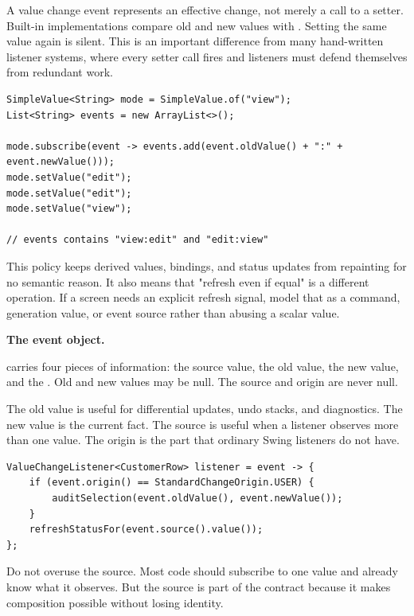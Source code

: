 A value change event represents an effective change, not merely a call to a
setter. Built-in implementations compare old and new values with
. Setting the same value again is silent. This is an
important difference from many hand-written listener systems, where every setter
call fires and listeners must defend themselves from redundant work.

\begin{lstlisting}[caption={Repeated equal values do not create useful events.}]
SimpleValue<String> mode = SimpleValue.of("view");
List<String> events = new ArrayList<>();

mode.subscribe(event -> events.add(event.oldValue() + ":" + event.newValue()));
mode.setValue("edit");
mode.setValue("edit");
mode.setValue("view");

// events contains "view:edit" and "edit:view"
\end{lstlisting}

This policy keeps derived values, bindings, and status updates from repainting
for no semantic reason. It also means that "refresh even if equal" is a
different operation. If a screen needs an explicit refresh signal, model that as
a command, generation value, or event source rather than abusing a scalar value.

\textbf{The event object.}

 carries four pieces of information: the source value,
the old value, the new value, and the . Old and new values may
be null. The source and origin are never null.

The old value is useful for differential updates, undo stacks, and diagnostics.
The new value is the current fact. The source is useful when a listener observes
more than one value. The origin is the part that ordinary Swing listeners do not
have.

\begin{lstlisting}[caption={Using old value, new value, source, and origin.}]
ValueChangeListener<CustomerRow> listener = event -> {
    if (event.origin() == StandardChangeOrigin.USER) {
        auditSelection(event.oldValue(), event.newValue());
    }
    refreshStatusFor(event.source().value());
};
\end{lstlisting}

Do not overuse the source. Most code should subscribe to one value and already
know what it observes. But the source is part of the contract because it makes
composition possible without losing identity.

